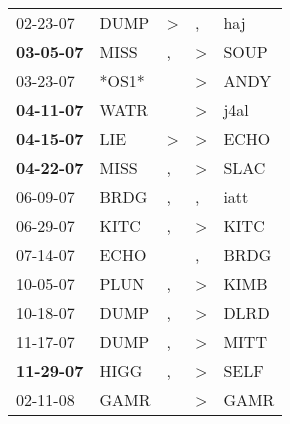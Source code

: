 \begin{supertabular}{p{0.07\textwidth}p{0.06\textwidth}p{0.02\textwidth}p{0.02\textwidth}p{0.06\textwidth}}
          02-23-07\textsuperscript{} &           DUMP\textsuperscript{} &     \textgreater &                , &            haj\textsuperscript{} \\
 \textbf{03-05-07\textsuperscript{}} &           MISS\textsuperscript{} &                , &     \textgreater &           SOUP\textsuperscript{} \\
          03-23-07\textsuperscript{} &                            *OS1* &                  &     \textgreater &           ANDY\textsuperscript{} \\
 \textbf{04-11-07\textsuperscript{}} &           WATR\textsuperscript{} &                  &     \textgreater &           j4al\textsuperscript{} \\
 \textbf{04-15-07\textsuperscript{}} &            LIE\textsuperscript{} &     \textgreater &     \textgreater &           ECHO\textsuperscript{} \\
 \textbf{04-22-07\textsuperscript{}} &           MISS\textsuperscript{} &                , &     \textgreater &           SLAC\textsuperscript{} \\
          06-09-07\textsuperscript{} &           BRDG\textsuperscript{} &                , &                , &           iatt\textsuperscript{} \\
          06-29-07\textsuperscript{} &           KITC\textsuperscript{} &                , &     \textgreater &           KITC\textsuperscript{} \\
          07-14-07\textsuperscript{} &           ECHO\textsuperscript{} &                  &                , &           BRDG\textsuperscript{} \\
          10-05-07\textsuperscript{} &           PLUN\textsuperscript{} &                , &     \textgreater &           KIMB\textsuperscript{} \\
          10-18-07\textsuperscript{} &           DUMP\textsuperscript{} &                , &     \textgreater &           DLRD\textsuperscript{} \\
          11-17-07\textsuperscript{} &           DUMP\textsuperscript{} &                , &     \textgreater &           MITT\textsuperscript{} \\
 \textbf{11-29-07\textsuperscript{}} &           HIGG\textsuperscript{} &                , &     \textgreater &           SELF\textsuperscript{} \\
          02-11-08\textsuperscript{} &           GAMR\textsuperscript{} &                  &     \textgreater &           GAMR\textsuperscript{} \\

\end{supertabular}
